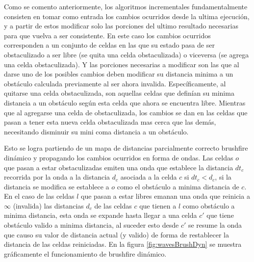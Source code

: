 Como se comento anteriormente, los algoritmos incrementales fundamentalmente consisten en tomar como entrada los cambios ocurridos desde la ultima ejecución, y a partir de estos modificar solo las porciones del ultimo resultado necesarias para que vuelva a ser consistente. En este caso los cambios ocurridos corresponden a un conjunto de celdas en las que su estado pasa de ser obstaculizado a ser libre (se quita una celda obstaculizada) o viceversa (se agrega una celda obstaculizada). Y las porciones necesarias a modificar son las que al darse uno de los posibles cambios deben modificar su distancia minima a un obstáculo calculada previamente al ser ahora invalida. Específicamente, al quitarse una celda obstaculizada, son aquellas celdas que definían su minima distancia a un obstáculo según esta celda que ahora se encuentra libre. Mientras que al agregarse una celda de obstaculizada, los cambios se dan en las celdas que pasan a tener esta nueva celda obstaculizada mas cerca que las demás, necesitando disminuir su mini coma distancia a un obstáculo.

Esto se logra partiendo de un mapa de distancias parcialmente correcto brushfire dinámico y propagando los cambios ocurridos en forma de ondas. Las celdas $o$ que pasan a estar obstaculizadas emiten una onda  que establece la distancia $dt_c$ recorrida por la onda a la distancia $d_c$ asociada a la celda $c$ si $dt_{c}<d_{c}$, si la distancia se modifica se establece a $o$ como el obstáculo a minima distancia de $c$. En el caso de las celdas $l$ que pasan a estar libres emanan una onda  que reinicia a $\infty$ (invalida) las distancias $d_c$ de las celdas $c$ que tienen a $l$ como obstáculo a minima distancia, esta onda se expande hasta llegar a una celda $c'$ que tiene obstáculo valido a minima distancia, al suceder esto desde $c'$ se resume la onda  que causo su valor de distancia actual (y valido) de forma de restablecer la distancia de las celdas reiniciadas. En la figura \ref{fig:wavesBrushDyn} se muestra gráficamente el funcionamiento de brushfire dinámico.

